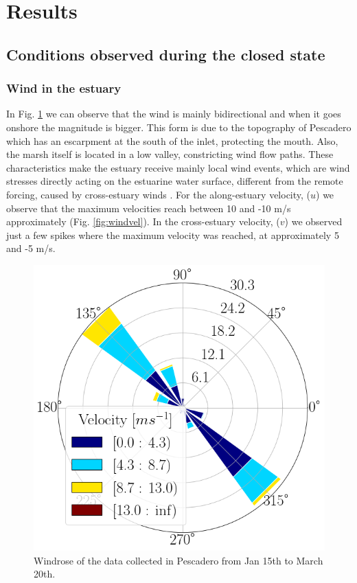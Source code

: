 \documentclass[tesis.tex]{subfiles}
\begin{document}
    
\section{Results}

\subsection{Conditions observed during the closed state}

\subsubsection{Wind in the estuary}

In Fig. \ref{fig:windrose} we can observe that the wind is mainly bidirectional and when it goes onshore the magnitude is bigger. This form is due to the topography of Pescadero which has an escarpment at the south of the inlet, protecting the mouth. Also, the marsh itself is located in a low valley, constricting wind flow paths. These characteristics make the estuary receive mainly local wind events, which are wind stresses directly acting on the estuarine water surface, different from the remote forcing, caused by cross-estuary winds \citep{payandeh2019subtidal}. For the along-estuary velocity, ($u$) we observe that the maximum velocities reach between 10 and -10 m/s approximately (Fig. \ref{fig:windvel}). In the cross-estuary velocity, ($v$) we observed just a few spikes where the maximum velocity was reached, at approximately 5 and -5 m/s. 

\begin{figure}[h!]
    \centering
    \includegraphics[scale=0.3]{Imagenes/windrose.png}
    \caption{Windrose of the data collected in Pescadero from Jan 15th to March 20th.}
    \label{fig:windrose}
\end{figure}
\end{document}

